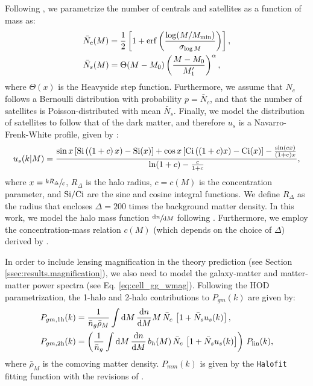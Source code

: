 \documentclass[a4paper,11pt]{article}
\begin{document}
    Following \cite{2011ApJ...736...59Z}, we parametrize the number of centrals and satellites as a function of mass as:
    \begin{align}
      &\bar{N}_c(M)=\frac{1}{2}\left[1+{\rm erf}\left(\frac{\log(M/M_{\rm min})}{\sigma_{\log M}}\right)\right],\\
      &\bar{N}_s(M)=\Theta(M-M_0)\left(\frac{M-M_0}{M_1'}\right)^\alpha,
    \end{align}
    where $\Theta(x)$ is the Heavyside step function. Furthermore, we assume that $N_c$ follows a Bernoulli distribution with probability $p=\bar{N}_c$, and that the number of satellites is Poisson-distributed with mean $\bar{N}_s$. Finally, we model the distribution of satellites to follow that of the dark matter, and therefore $u_s$ is a Navarro-Frenk-White profile, given by \cite{Navarro:1996}:
    \begin{equation}
      u_s(k|M)=\frac{\sin x\left[{\rm Si}\left((1+c)\,x\right)-{\rm Si}(x)\right]+\cos x\left[{\rm Ci}\left((1+c)x\right)-{\rm Ci}(x)\right]-\frac{\sin(cx)}{(1+c)x}}{{\rm ln}(1+c)-\frac{c}{1+c}},
    \end{equation}
    where $x=\sfrac{k R_\Delta}{c}$, $R_\Delta$ is the halo radius, $c=c(M)$ is the concentration parameter, and ${\rm Si}/{\rm Ci}$ are the sine and cosine integral functions. We define $R_\Delta$ as the radius that encloses $\Delta=200$ times the background matter density. In this work, we model the halo mass function $\sfrac{\mathrm{d}n}{\mathrm{d}M}$ following \cite{Tinker:2010}. Furthermore, we employ the concentration-mass relation $c(M)$ (which depends on the choice of $\Delta$) derived by \cite{Duffy:2008}.

    In order to include lensing magnification in the theory prediction (see Section \ref{ssec:results.magnification}), we also need to model the galaxy-matter and matter-matter power spectra (see Eq. \ref{eq:cell_gg_wmag}). Following the HOD parametrization, the 1-halo and 2-halo contributions to $P_{gm}(k)$ are given by:
    \begin{align}
      & P_{gm,{\rm 1h}}(k)=\frac{1}{\bar{n}_g\bar{\rho}_M} \int \mathrm{d}M\,\frac{\mathrm{d}n}{\mathrm{d}M} M\,\bar{N}_c\,\left[1+\bar{N}_su_s(k)\right],\\
      & P_{gm,{\rm 2h}}(k)=\left(\frac{1}{\bar{n}_g} \int \mathrm{d}M\,\frac{\mathrm{d}n}{\mathrm{d}M}\,b_h(M)\,\bar{N}_c\,\left[1+\bar{N}_su_s(k)\right]\right)\,P_{\rm lin}(k),
    \end{align}
    where $\bar{\rho}_M$ is the comoving matter density. $P_{mm}(k)$ is given by the {\tt Halofit} fitting function \cite{Smith:2003} with the revisions of \cite{Takahashi:2012}.
\end{document}
